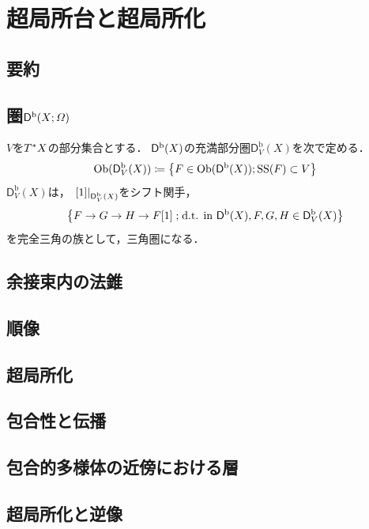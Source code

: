 \chapter{超局所台と超局所化}
\newcommand{\mucat}[2][]{\mathsf{D}^{\mathrm{b}}_{#1}(#2)}

\section*{要約}
\section{圏\(\Dompb(X;\varOmega)\)}
\(V\)を\(\cotb[X]\)の部分集合とする．
\(\Dompb(X)\)の充満部分圏\(\mucat[V]{X}\)を次で定める．
\begin{equation}
    \Ob(\mucat[V]{X})\coloneqq
    \left\{F\in\Ob(\Dompb(X));\muS(F)\subset V\right\}
\end{equation}
\(\mucat[V]{X}\)は，
\(\mres[{[1]}]{\mucat[V]{X}}\)をシフト関手，
\[
    \left\{F\to G\to H\to F[1]\mathrel{;}\text{d.t. in \(\Dompb(X)\)}, F,G,H\in\mucat[V]{X}\right\}
\]
を完全三角の族として，三角圏になる．
\section{余接束内の法錐}
\section{順像}
\section{超局所化}
\section{包合性と伝播}
\section{包合的多様体の近傍における層}
\section{超局所化と逆像}